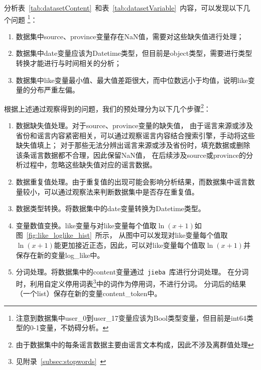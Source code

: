 分析表~\ref{tab:datasetContent}~和表~\ref{tab:datasetVariable}~内容，可以发现以下几个问题
\footnote{注意到数据集中user\_0到user\_17变量应该为Bool类型变量，但目前是int64类型的0-1变量，不妨碍分析。}：
\begin{enumerate}
    \item 数据集中source、province变量存在NaN值，需要对这些缺失值进行处理；
    \item 数据集中date变量应该为Datetime类型，但目前是object类型，需要进行类型转换才能进行与时间相关的分析；
    \item 数据集中like变量最小值、最大值差距很大，而中位数远小于均值，说明like变量的分布严重左偏。
\end{enumerate}

根据上述通过观察得到的问题，我们的预处理分为以下几个步骤\footnote{由于数据集中的每条谣言数据主要由谣言文本构成，因此不涉及离群值处理}：
\begin{enumerate}
    \item 数据缺失值处理。对于source、province变量的缺失值，
    由于谣言来源或涉及省份和谣言内容紧密相关，可以通过观察谣言内容结合搜索引擎，手动将这些缺失值填上；
    对于那些无法分辨出谣言来源或涉及省份时，填充数据或删除该条谣言数据都不合理，因此保留NaN值，
    在后续涉及source或province的分析过程中，忽略这些缺失值对应的谣言数据。
    \item 数据重复值处理。由于重复值的出现可能会影响分析结果，而数据集中谣言数量较小，可以通过观察法来判断数据集中是否存在重复值。
    \item 数据类型转换。将数据集中的date变量转换为Datetime类型。 %
    \item 变量数值变换。like变量与对like变量每个值取$\ln(x+1)$如图~\ref{fig:like_loglike_hist}~所示，
    从图中可以发现对like变量每个值取$\ln(x+1)$能更加接近正态，因此，可以对like变量每个值取$\ln(x+1)$并保存在新的变量log\_like中。
    \item 分词处理。将数据集中的content变量通过~\verb|jieba|~库进行分词处理。
    在分词时，利用自定义停用词表\footnote{见附录~\ref{subsec:stopwords}~}中的词作为停用词，不进行分词。
    分词后的结果（一个list）保存在新的变量content\_token中。 %
\end{enumerate}

